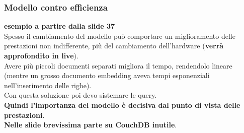 \documentclass[a4paper,12pt, oneside]{book}
\begin{document}
\subsubsection{Modello contro efficienza}
\textbf{esempio a partire dalla slide 37}\\
Spesso il cambiamento del modello può comportare un miglioramento delle
prestazioni non indifferente, più del cambiamento dell'hardware (\textbf{verrà
  approfondito in live}).\\
Avere più piccoli documenti separati migliora il tempo, rendendolo lineare
(mentre un grosso documento embedding aveva tempi esponenziali nell'inserimento
delle righe).\\
Con questa soluzione poi devo sistemare le query.\\
\textbf{Quindi l'importanza del modello è decisiva dal punto di vista delle
  prestazioni}.\\
\textbf{Nelle slide brevissima parte su CouchDB inutile}.
\end{document}
